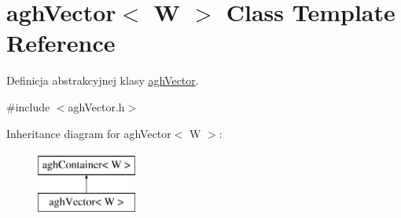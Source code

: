 \hypertarget{classaghVector}{\section{agh\-Vector$<$ \-W $>$ \-Class \-Template \-Reference}
\label{classaghVector}
}


\-Definicja abstrakcyjnej klasy \hyperlink{classaghVector}{agh\-Vector}.  




{\ttfamily \#include $<$agh\-Vector.\-h$>$}

\-Inheritance diagram for agh\-Vector$<$ \-W $>$\-:\begin{figure}[H]
\begin{center}
\leavevmode
\includegraphics[height=2.000000cm]{classaghVector}
\end{center}
\end{figure}
